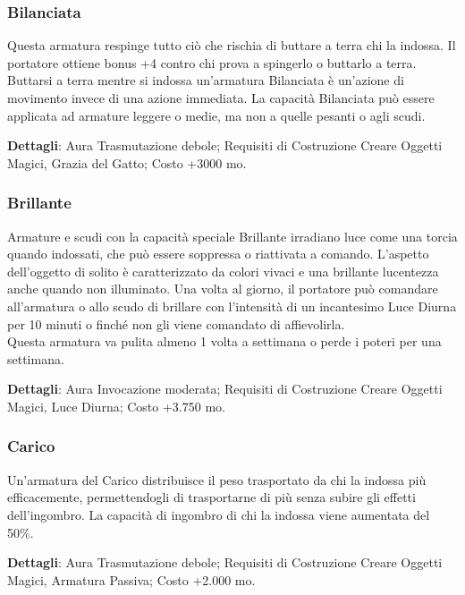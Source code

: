 \begin{multicols}{2}
\subsubsection{Bilanciata}

Questa armatura respinge tutto ciò che rischia di buttare a terra chi la indossa. Il portatore ottiene bonus +4 contro chi prova a spingerlo o buttarlo a terra.\\
Buttarsi a terra mentre si indossa un'armatura Bilanciata è un'azione di movimento invece di una azione immediata. La capacità Bilanciata può essere applicata ad armature leggere o medie, ma non a quelle pesanti o agli scudi.

\textbf{Dettagli}: Aura Trasmutazione debole; Requisiti di Costruzione Creare Oggetti Magici, Grazia del Gatto; Costo +3000 mo.

\subsubsection{Brillante}

Armature e scudi con la capacità speciale Brillante irradiano luce come una torcia quando indossati, che può essere soppressa o riattivata a comando. L'aspetto dell'oggetto di solito è caratterizzato da colori vivaci e una brillante lucentezza anche quando non illuminato. Una volta al giorno, il portatore può comandare all'armatura o allo scudo di brillare con l'intensità di un incantesimo Luce Diurna per 10 minuti o finché non gli viene comandato di affievolirla.\\
Questa armatura va pulita almeno 1 volta a settimana o perde i poteri per una settimana.

\textbf{Dettagli}: Aura Invocazione moderata; Requisiti di Costruzione Creare Oggetti Magici, Luce Diurna; Costo +3.750 mo.

\subsubsection{Carico}

Un'armatura del Carico distribuisce il peso trasportato da chi la indossa più efficacemente, permettendogli di trasportarne di più senza subire gli effetti dell'ingombro. La capacità di ingombro di chi la indossa viene aumentata del 50\%.

\textbf{Dettagli}: Aura Trasmutazione debole; Requisiti di Costruzione Creare Oggetti Magici, Armatura Passiva; Costo +2.000 mo.


\end{multicols}
